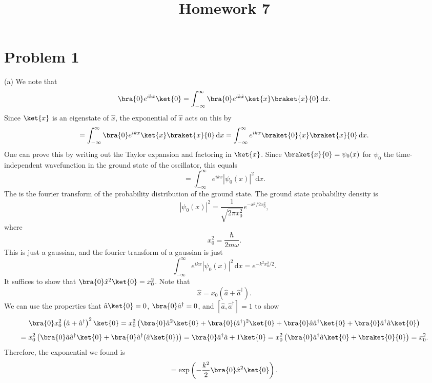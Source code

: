 \documentclass[11pt, letterpaper]{article}
\title{Homework 7}
\begin{document}
\makeproblem
\section{Problem 1}
(a) We note that
\[
	\bra{0}e^{ik \hat{x} } \ket{0}=\int_{-\infty }^{\infty } \bra{0}e^{ik \hat{x} } \ket{x}\braket{x}{0} \,\mathrm{d} x
.\]
Since $\ket{x}$ is an eigenstate of $\hat{x} $, the exponential of $\hat{x} $ acts on this by
\[
	=\int_{-\infty }^{\infty } \bra{0}e^{ikx} \ket{x}\braket{x}{0} \,\mathrm{d} x
	=\int_{-\infty }^{\infty } e^{ikx} \braket{0}{x}\braket{x}{0} \,\mathrm{d} x
.\]
One can prove this by writing out the Taylor expansion and factoring in $\ket{x}$. Since $\braket{x}{0}=\psi _0(x)$ for $\psi _0$ the time-independent wavefunction in the ground state of the oscillator, this equals
\[
	=\int_{-\infty }^{\infty } e^{ikx} \left| \psi _0 (x)\right| ^2 \,\mathrm{d} x
.\]
The is the fourier transform of the probability distribution of the ground state. The ground state probability density is
\[
	\left| \psi _0(x) \right| ^2=\frac{1}{\sqrt{2\pi x_0^2} } e^{-x^2/2x_0^2} ,
\]
where
\[
	x_0^2 = \frac{\hbar}{2m\omega } 
.\]
This is just a gaussian, and the fourier transform of a gaussian is just
\[
	\int_{-\infty }^{\infty } e^{ikx} \left| \psi _0(x) \right| ^2 \,\mathrm{d} x=e^{-k^2 x_0^2/2} 
.\]
It suffices to show that $\bra{0}\hat{x}^2 \ket{0}=x_0^2$. Note that
\[
	\hat{x} =x_0\left( \hat{a} +\hat{a} ^\dagger \right) 
.\]
We can use the properties that $\hat{a} \ket{0}=0$, $\bra{0}\hat{a} ^\dagger=0$, and $[\hat{a} ,\hat{a} ^\dagger]=1$ to show
\[
	\bra{0}x_0^2\left( \hat{a} +\hat{a} ^\dagger \right)^2 \ket{0}=x_0^2\left( \bra{0}\hat{a} ^2\ket{0}+\bra{0}(\hat{a} ^\dagger)^2\ket{0} + \bra{0}\hat{a} \hat{a} ^\dagger\ket{0}+\bra{0}\hat{a} ^\dagger \hat{a} \ket{0} \right) 	
\]
\[
	=x_0^2\left( \bra{0}\hat{a} \hat{a} ^\dagger\ket{0}+\bra{0}\hat{a} ^\dagger (\hat{a} \ket{0}) \right) = \bra{0}\hat{a} ^\dagger \hat{a} +1\ket{0} =x_0^2\left( \bra{0}\hat{a}^\dagger \hat{a} \ket{0}+\braket{0}{0} \right) =x_0^2
.\]
Therefore, the exponential we found is
\[
	=\exp \left( -\frac{k^2}{2} \bra{0}\hat{x} ^2\ket{0} \right) 
.\]
\end{document}
